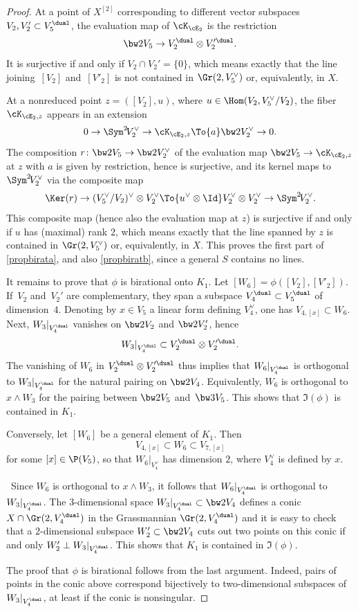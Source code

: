 \begin{proof}
At a point of $ X^{[2]}$ corresponding to different vector subspaces $V_2,V_2' \subset V_5^\dual$, the evaluation map of $ \cK_{\cE_2} $ is the restriction
\[
\bw2V_5\to V_2^\dual\otimes V_2^{\prime\dual}.
\]
It is surjective if and only if
$V_2\cap V_2'=\{0\}$, which means exactly that the line joining~$[V_2]$ and~$[V'_2]$
is not contained in $\Gr(2, V_5^\vee)$ or, equivalently, in $X$.

At a nonreduced point $z=([V_2],u)$, where $u\in\Hom (V_2,V_5^\vee/V_2)$, the fiber $\cK_{\cE_2,z}$ appears in an extension
\[
0\to \Sym^2\!V_2^\vee
\to \cK_{\cE_2,z} \To{a} \bw2V_2^\vee\to 0.
\]
The composition $r\colon\bw2V_5\to \bw2V_2^\vee$ of the evaluation map $\bw2V_5\to \cK_{\cE_2,z}$ at $z$ with $a$ is given by restriction, hence is surjective, and its kernel maps to $\Sym^2\!V_2^\vee$ via the composite map
\[
\Ker(r)\to (V_5^\vee/V_2)^\vee\otimes V_2^\vee \To{u^\vee\otimes \Id} V_2^\vee \otimes V_2^\vee
\to \Sym^2\!V_2^\vee.
\]
This composite map (hence also the evaluation map at $z$) is surjective if and only if $u$ has (maximal) rank $2$, which means exactly that the line spanned by $z$ is contained in $\Gr(2, V_5^\vee)$ or, equivalently, in $X$. This proves the first part of \eqref{propbirata}, and also \eqref{propbiratb}, since a general $S$ contains no lines.

It remains to prove that $\phi$ is birational onto $K_1$. Let $[W_6]=\phi([V_2],[V'_2])$.
If~$V_2$ and~$V_2'$ are complementary, they span a subspace $V_4^\dual\subset V_5^\dual$ of dimension~$4$. Denoting by $x\in V_5$ a linear form defining $V_4^\vee$, one has $V_{4,[x]}\subset W_6$. Next, $W_3\vert_{ V_4^\dual}$ vanishes on $\bw2V_2$ and $\bw2{V_2'}$, hence
\[
W_3\vert_{ V_4^\dual}\subset V_2^\dual\otimes V_2^{\prime\dual}.
\]
The vanishing of $W_6$ in $ V_2^\dual\otimes V_2^{\prime\dual}$ thus implies that
$W_{6}\vert_{V_4^\dual}$ is orthogonal to
$W_3\vert_{ V_4^\dual}$ for the natural pairing on $\bw2V_4$. Equivalently, $W_6$ is orthogonal to
$ x\wedge W_3$ for the pairing between
$\bw2V_5$ and~$ \bw3V_5$.
This shows that $\Im (\phi)$ is contained in
$K_1$.

Conversely, let $[W_6]$ be a general element of
$K_1$. Then
\[
V_{4,[x]}\subset W_6\subset V_{7,[x]}
\]
for some $[x]\in \P(V_5)$, so that $W_6\vert_{V_4^\vee}$ has dimension $2$, where $V_4^\vee$ is defined by $x$.

\ Since $W_6 $ is orthogonal to $ x\wedge W_3$, it follows that
$W_{6}\vert_{ V_4^\dual} $ is orthogonal to $ W_3\vert_{ V_4^\dual}$. The $3$-dimensional space $W_3\vert_{ V_4^\dual}\subset \bw2V_4$ defines
a conic $X\cap \Gr(2,V_4^\dual)$ in the Grassmannian $\Gr(2,V_4^\dual)$ and it is easy to check that
a $2$-dimensional subspace $W_2' \subset \bw2V_4$ cuts out two points on this conic
if and only $W_2'\perp W_3\vert_{ V_4^\dual}$. This shows that $K_1$ is contained in $\Im(\phi)$.

The proof that $\phi$ is birational follows from the last argument. Indeed, pairs of points in the conic above
correspond bijectively to two-dimensional subspaces of $W_3\vert_{ V_4^\dual}$, at least if the conic is nonsingular.
\end{proof}

